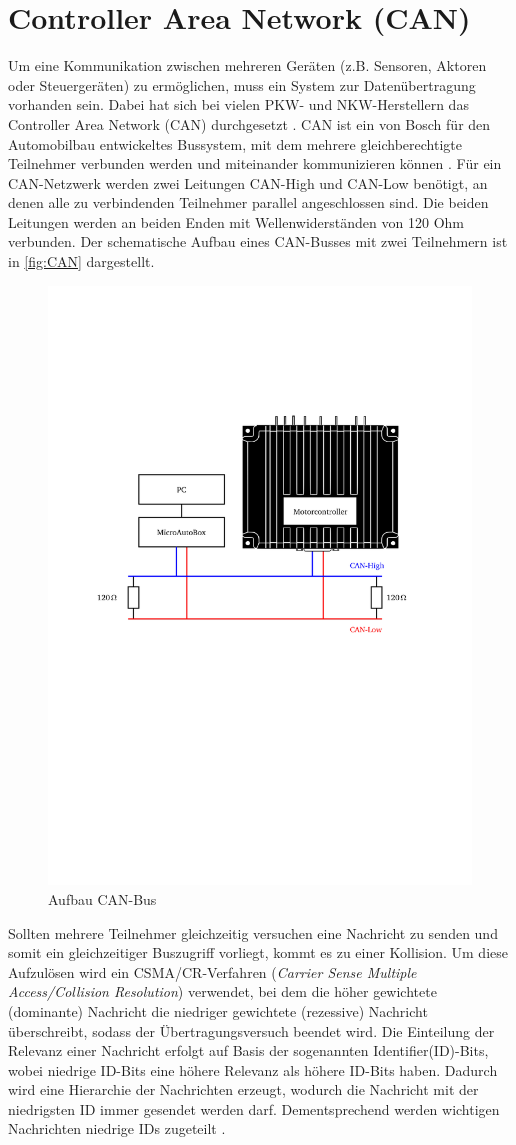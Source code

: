 \section{Controller Area Network (CAN)}\label{sec:CAN_KAP2}
Um eine Kommunikation zwischen mehreren Geräten (z.B. Sensoren, Aktoren oder Steuergeräten) zu ermöglichen, muss ein System zur Datenübertragung vorhanden sein. Dabei hat sich bei vielen PKW- und NKW-Herstellern  das Controller Area Network (CAN) durchgesetzt \cite[S.57]{Werner2014}. CAN ist ein von Bosch für den Automobilbau entwickeltes Bussystem, mit dem mehrere gleichberechtigte Teilnehmer verbunden werden und miteinander kommunizieren können \cite[S. 278]{Woern2006}.
Für ein CAN-Netzwerk werden zwei Leitungen CAN-High und CAN-Low benötigt, an denen alle zu verbindenden Teilnehmer parallel angeschlossen sind. Die beiden Leitungen werden an beiden Enden mit Wellenwiderständen von 120 Ohm verbunden. Der schematische Aufbau eines CAN-Busses mit zwei Teilnehmern ist in \autoref{fig:CAN} dargestellt.\\
\begin{figure}[h]
	\centering
		\includegraphics[width=0.7\columnwidth]{Bilder/CAN2.pdf}
	\caption{Aufbau CAN-Bus \cite[S.158]{manual}}
	\label{fig:CAN}
\end{figure} \noindent
Sollten mehrere Teilnehmer gleichzeitig versuchen eine Nachricht zu senden und somit ein gleichzeitiger Buszugriff vorliegt, kommt es zu einer Kollision. Um diese Aufzulösen wird ein CSMA/CR-Verfahren (\textit{Carrier Sense Multiple Access/Collision Resolution}) verwendet, bei dem die höher gewichtete (dominante) Nachricht die niedriger gewichtete (rezessive) Nachricht überschreibt, sodass der Übertragungsversuch beendet wird. Die Einteilung der Relevanz einer Nachricht erfolgt auf Basis der sogenannten Identifier(ID)-Bits, wobei niedrige ID-Bits eine höhere Relevanz als höhere ID-Bits haben. Dadurch wird eine Hierarchie der Nachrichten erzeugt, wodurch die Nachricht mit der niedrigsten ID immer gesendet werden darf. Dementsprechend werden wichtigen Nachrichten niedrige IDs zugeteilt \cite{Lawrenz2010}. 
